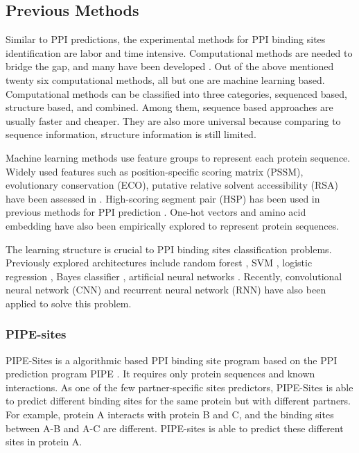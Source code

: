 \subsection{Previous Methods}
Similar to PPI predictions, the experimental methods for PPI binding sites identification are labor and time intensive. Computational methods are needed to bridge the gap, and many have been developed \cite{cao2006enhanced, ofran2007isis, du2009improved, chen2009sequence, london2010structural, chen2010sequence, murakami2010applying, xue2011homppi, amos2011binding, jones2012psicov, asadabadi2013predictions, singh2014springs, wang2014fast, geng2015prediction, laine2015local, hwang2016hybrid, maheshwari2015prediction, liu2016prediction, wei2016protein, maheshwari2016template, jia2016ippbs, zhang2019sequence, wang2019protein, zhang2019scriber, zeng2019protein, xie2020prediction}. Out of the above mentioned twenty six computational methods, all but one are machine learning based. Computational methods can be classified into three categories, sequenced based, structure based, and combined. Among them, sequence based approaches are usually faster and cheaper. They are also more universal because comparing to sequence information, structure information is still limited. 

Machine learning methods use feature groups to represent each protein sequence. Widely used features such as position-specific scoring matrix (PSSM), evolutionary conservation (ECO), putative relative solvent accessibility (RSA) have been assessed in \cite{zhang2019comprehensive}. High-scoring segment pair (HSP) has been used in previous methods for PPI prediction \cite{li2017sprint}. One-hot vectors \cite{zhang2019sequence, zeng2019protein} and amino acid embedding \cite{asgari2015continuous, heinzinger2019modeling, asgari2019probabilistic} have also been empirically explored to represent protein sequences.

The learning structure is crucial to PPI binding sites classification problems. Previously explored architectures include random forest \cite{wei2016protein, wang2019protein}, SVM \cite{wei2016protein}, logistic regression \cite{zhang2019scriber}, Bayes classifier \cite{murakami2010applying}, artificial neural networks \cite{singh2014springs}. Recently, convolutional neural network (CNN) \cite{zeng2019protein} and recurrent neural network (RNN) \cite{zhang2019sequence} have also been applied to solve this problem. 

\subsubsection{PIPE-sites}
PIPE-Sites \cite{amos2011binding} is a algorithmic based PPI binding site program based on the PPI prediction program PIPE \cite{Pitre06_PIPE}. It requires only protein sequences and known interactions. As one of the few partner-specific sites predictors, PIPE-Sites is able to predict different binding sites for the same protein but with different partners. For example, protein A interacts with protein B and C, and the binding sites between A-B and A-C are different. PIPE-sites is able to predict these different sites in protein A.

